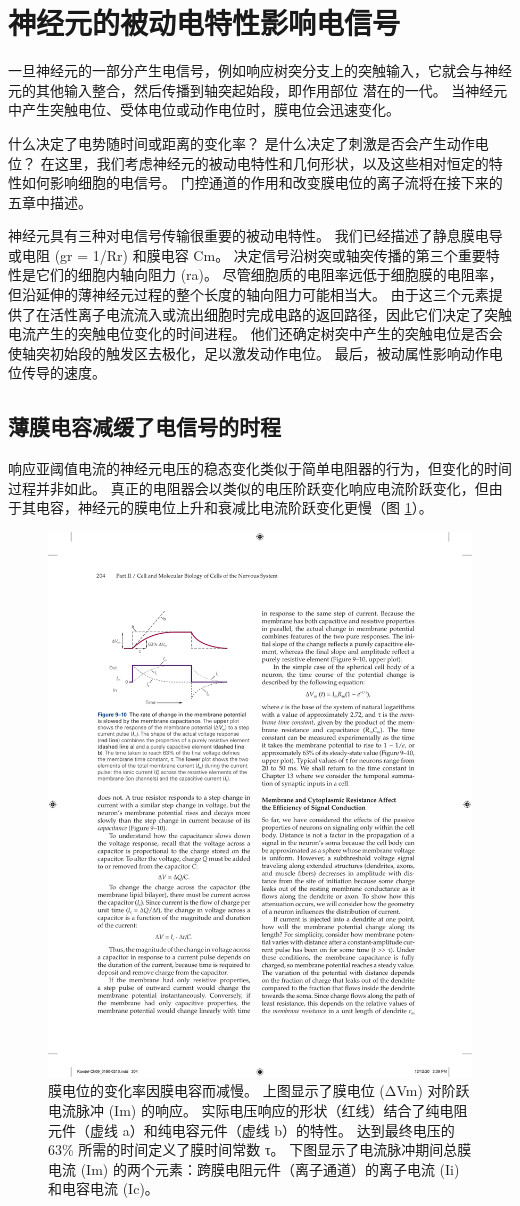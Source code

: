 \section{神经元的被动电特性影响电信号}
一旦神经元的一部分产生电信号，例如响应树突分支上的突触输入，它就会与神经元的其他输入整合，然后传播到轴突起始段，即作用部位 潜在的一代。 
当神经元中产生突触电位、受体电位或动作电位时，膜电位会迅速变化。


什么决定了电势随时间或距离的变化率？ 
是什么决定了刺激是否会产生动作电位？ 
在这里，我们考虑神经元的被动电特性和几何形状，以及这些相对恒定的特性如何影响细胞的电信号。 
门控通道的作用和改变膜电位的离子流将在接下来的五章中描述。


神经元具有三种对电信号传输很重要的被动电特性。 
我们已经描述了静息膜电导或电阻 (gr = 1/Rr) 和膜电容 Cm。 
决定信号沿树突或轴突传播的第三个重要特性是它们的细胞内轴向阻力 (ra)。 
尽管细胞质的电阻率远低于细胞膜的电阻率，但沿延伸的薄神经元过程的整个长度的轴向阻力可能相当大。 
由于这三个元素提供了在活性离子电流流入或流出细胞时完成电路的返回路径，因此它们决定了突触电流产生的突触电位变化的时间进程。 
他们还确定树突中产生的突触电位是否会使轴突初始段的触发区去极化，足以激发动作电位。 
最后，被动属性影响动作电位传导的速度。


\subsection{薄膜电容减缓了电信号的时程}
响应亚阈值电流的神经元电压的稳态变化类似于简单电阻器的行为，但变化的时间过程并非如此。 
真正的电阻器会以类似的电压阶跃变化响应电流阶跃变化，但由于其电容，神经元的膜电位上升和衰减比电流阶跃变化更慢（图 \ref{fig:9_10}）。

\begin{figure}[htbp]
	\centering
	\includegraphics[width=0.5\linewidth]{chap09/fig_9_10}
	\caption{膜电位的变化率因膜电容而减慢。 上图显示了膜电位 (ΔVm) 对阶跃电流脉冲 (Im) 的响应。 实际电压响应的形状（红线）结合了纯电阻元件（虚线 a）和纯电容元件（虚线 b）的特性。 达到最终电压的 63\% 所需的时间定义了膜时间常数 τ。 下图显示了电流脉冲期间总膜电流 (Im) 的两个元素：跨膜电阻元件（离子通道）的离子电流 (Ii) 和电容电流 (Ic)。}
	\label{fig:9_10}
\end{figure}


